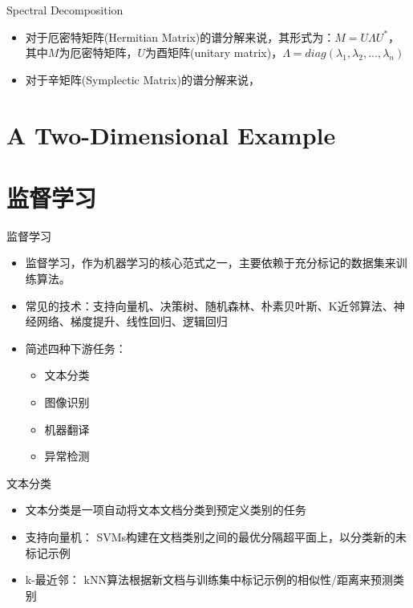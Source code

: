 \documentclass[UTF8,AutoFakeBold,AutoFakeSlant]{beamer}
\begin{document}
\begin{frame}{Spectral Decomposition}
    \begin{itemize}
        \item 对于厄密特矩阵(Hermitian Matrix)的谱分解来说，其形式为：$M = U \Lambda U^*$，其中$M$为厄密特矩阵，$U$为酉矩阵(unitary matrix)，$\Lambda=diag(\lambda_1, \lambda_2,\dots, \lambda_n)$
        \item 对于辛矩阵(Symplectic Matrix)的谱分解来说，
    \end{itemize}
\end{frame}
\section{A Two-Dimensional Example}
\section{监督学习}
\begin{frame}{监督学习}
    \begin{itemize}
        \item 监督学习，作为机器学习的核心范式之一，主要依赖于充分标记的数据集来训练算法。
        \item 常见的技术：支持向量机、决策树、随机森林、朴素贝叶斯、K近邻算法、神经网络、梯度提升、线性回归、逻辑回归
        \item 简述四种下游任务：
              \begin{itemize}
                  \item 文本分类
                  \item 图像识别
                  \item 机器翻译
                  \item 异常检测
              \end{itemize}
    \end{itemize}
\end{frame}

\begin{frame}{文本分类}
    \small
    \begin{itemize}
        \item 文本分类是一项自动将文本文档分类到预定义类别的任务
        \item 支持向量机： SVMs构建在文档类别之间的最优分隔超平面上，以分类新的未标记示例
        \item k-最近邻： kNN算法根据新文档与训练集中标记示例的相似性/距离来预测类别
    \end{itemize}
\end{frame}
\end{document}
